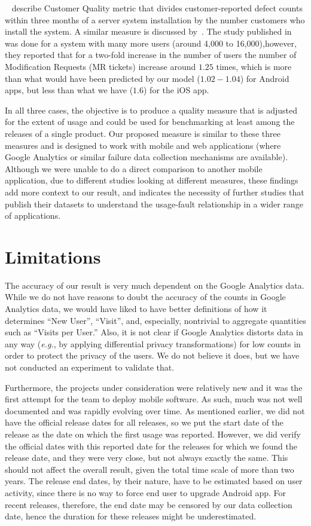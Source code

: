 \documentclass[smallcondensed]{svjour3}     %
\begin{document}
~\cite{hmps15} describe Customer Quality metric that divides customer-reported defect counts within three months of a server system installation by the number customers who install the system. A similar measure is discussed by~\cite{IQ08}.
The study published in~\cite{IQ08} was done for a system with many 
more users (around 4,000 to 16,000),however, they reported that for a two-fold increase in the 
number of users the number of Modification Requests (MR tickets) increase around $1.25$ times, 
which is more than what would have been predicted by our model ($1.02 - 1.04$) for Android apps, but less than what we have ($1.6$) for the iOS app. 

In all three cases, the objective is to produce a quality measure that is adjusted for the extent of usage and could be used for benchmarking at least among the releases of a single product. Our proposed measure is similar to these three measures and is designed to work with mobile and web applications (where Google Analytics or similar failure data collection mechanisms are available).
Although we were unable to do a direct comparison to another mobile application, due to different studies looking at different measures, these findings add more context to our result, and indicates the necessity of further studies that publish their datasets to understand the usage-fault relationship in a wider range of applications.


\section{Limitations}\label{s:limitation}

The accuracy of our result is very much dependent on the Google
Analytics data. While we do not have reasons to doubt the accuracy of
the counts in Google
Analytics data, we would have liked to have better definitions of
how it determines ``New User'', ``Visit'', and, especially,
nontrivial to aggregate quantities such as ``Visits per User.'' Also,
it is not clear if Google
Analytics distorts data in any way (\emph{e.g.}, by applying differential 
privacy transformations) for low counts in order to protect
the privacy of the users. We do not believe it does, but we have not
conducted an experiment to validate that. 

Furthermore, the projects under consideration were relatively new and
it was the first attempt for the team to deploy mobile software. As
such, much was not well documented and was rapidly
evolving over time. As mentioned earlier, we did not have the official release
dates for all releases, so we put the start date of the release as
the date on which the first usage was reported. However, we did
verify the official dates with this reported date for the releases
for which we found the release date, and they were very close, but
not always exactly the same. This should not affect
the overall result, given the total time scale of more than two
years. The release end dates, by their nature, have to be estimated 
based on user activity, since there is no way to force end user
to upgrade Android app. For recent releases, therefore, the end date 
may be censored by our data
collection date, hence the duration for these releases might be
underestimated. 
\end{document}
